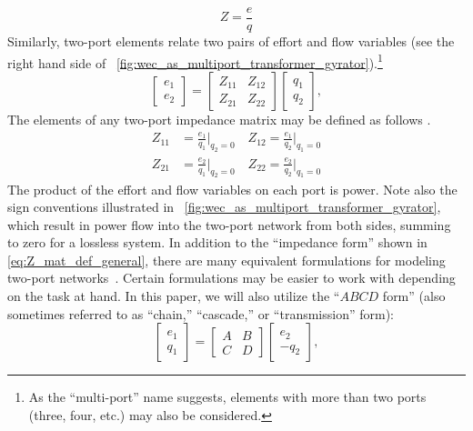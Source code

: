 \documentclass[twocolumn]{autart}
\begin{document}
%
\begin{equation}
        Z = \frac{e}{q}
\end{equation}
%
Similarly, two-port elements relate two pairs of effort and flow variables (see the right hand side of \figurename~\ref{fig:wec_as_multiport_transformer_gyrator}).\footnote{As the ``multi-port'' name suggests, elements with more than two ports (three, four, etc.) may also be considered.}
%
\begin{equation} \label{eq:Z_mat_def_general}
        \begin{bmatrix} e_1 \\ e_2 \end{bmatrix} = \begin{bmatrix} Z_{11} & Z_{12} \\ Z_{21} & Z_{22} \end{bmatrix} \begin{bmatrix} q_1 \\ q_2 \end{bmatrix},
\end{equation}
%
The elements of any two-port impedance matrix may be defined as follows \cite{CircuitFundamental}.
%
\begin{equation} \label{eq:Z_mat_elements_def}
        \begin{aligned}
                Z_{11}& = \frac{e_1}{q_1} \bigg \vert_{q_2=0} \quad
                Z_{12} = \frac{e_1}{q_2} \bigg \vert_{q_1=0}  \\[1em]
                Z_{21}& = \frac{e_2}{q_1} \bigg \vert_{q_2=0} \quad
                Z_{22} = \frac{e_2}{q_2} \bigg \vert_{q_1=0} 
        \end{aligned}
\end{equation}
%
The product of the effort and flow variables on each port is power.
Note also the sign conventions illustrated in \figurename~\ref{fig:wec_as_multiport_transformer_gyrator}, which result in power flow into the two-port network from both sides, summing to zero for a lossless system.
%
In addition to the ``impedance form'' shown in \eqref{eq:Z_mat_def_general}, there are many equivalent formulations for modeling two-port networks~\cite{CircuitFundamental}.
Certain formulations may be easier to work with depending on the task at hand.
In this paper, we will also utilize the ``$ABCD$ form'' (also sometimes referred to as ``chain,'' ``cascade,'' or ``transmission'' form):
%
\begin{equation}
        \label{eq:abcd_mat_def_general}
        \begin{bmatrix} e_1 \\ q_1 \end{bmatrix}
        = 
        \begin{bmatrix} A & B \\ C & D \end{bmatrix}
        \begin{bmatrix} e_2 \\ - q_2 \end{bmatrix},
\end{equation}
\end{document}
